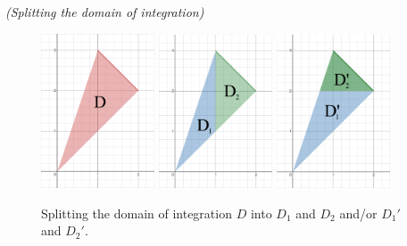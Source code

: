 \newpage 

\begin{solution}
    \textit{(Splitting the domain of integration)}
    
    \begin{figure}[h!]
        \centering
        \includegraphics[width=0.3\textwidth]{Pictures/Tutorial 5-1.png} \quad
        \includegraphics[width=0.3\textwidth]{Pictures/Tutorial 5-3.png} \quad 
        \includegraphics[width=0.3\textwidth]{Pictures/Tutorial 5-4.png}
        \caption{Splitting the domain of integration \(D\) into \(D_1\) and \(D_2\) and/or \(D_1'\) and \(D_2'\).}
    \end{figure}
    

\end{solution}
